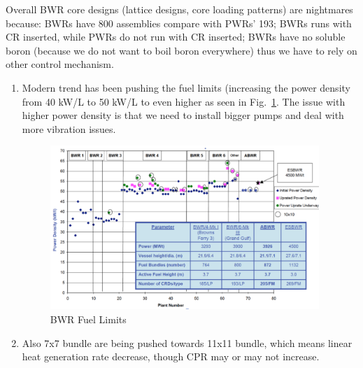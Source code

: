 \documentclass{school-22.211-notes}
\begin{document}
Overall BWR core designs (lattice designs, core loading patterns) are nightmares because: BWRs have 800 assemblies compare with PWRs' 193; BWRs runs with CR inserted, while PWRs do not run with CR inserted; BWRs have no soluble boron (because we do not want to boil boron everywhere) thus we have to rely on other control mechanism. 
\begin{enumerate}
\item Modern trend has been pushing the fuel limits (increasing the power density from 40 kW/L to 50 kW/L to even higher as seen in Fig.~\ref{BWR-fuel-limits}. The issue with higher power density is that we need to install bigger pumps and deal with more vibration issues. 
  \begin{figure}[ht]
    \centering
    \includegraphics[width=4in]{images/design/BWR-fuel-limits.png}
    \caption{BWR Fuel Limits} \label{BWR-fuel-limits} 
    \end{figure}

\item Also 7x7 bundle are being pushed towards 11x11 bundle, which means linear heat generation rate decrease, though CPR may or may not increase. 


\end{enumerate}
\end{document}
